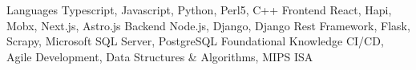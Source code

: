 
\begin{cvskills}
  \cvskill
    {Languages} %
    {Typescript, Javascript, Python, Perl5, C++} %
  \cvskill
    {Frontend}
    {React, Hapi, Mobx, Next.js, Astro.js}
  \cvskill
    {Backend} %
    {Node.js, Django, Django Rest Framework, Flask, Scrapy, Microsoft SQL Server, PostgreSQL} %
  \cvskill
    {Foundational Knowledge}
    {CI/CD, Agile Development, Data Structures \& Algorithms, MIPS ISA}
\end{cvskills}
